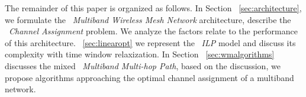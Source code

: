 The remainder of this paper is organized as follows. In Section ~\ref{sec:architecture}, we formulate the ~\emph{Multiband Wireless Mesh Network} architecture, describe the ~\emph{Channel Assignment} problem. We analyze the factors relate to the performance of this architecture. 
~\ref{sec:linearopt} we represent the ~\emph{ILP} model and discuss its complexity with time window relaxization.
In Section ~\ref{sec:wmalgorithms} discusses the mixed ~\emph{Multiband Multi-hop Path}, based on the discussion, we propose algorithms approaching the optimal channel assignment of a multiband network. 

